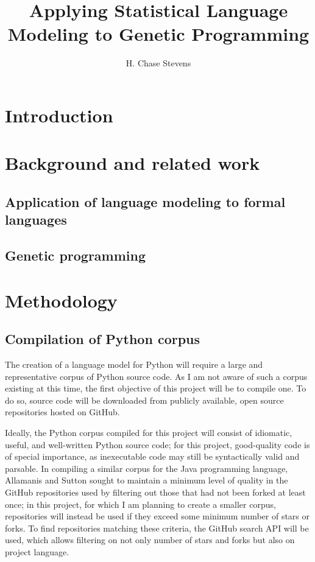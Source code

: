 \documentclass[a4paper,11pt]{proposal}
\title{Applying Statistical Language Modeling to Genetic Programming}
\author{H. Chase Stevens}
\begin{document}
\maketitle 
\parindent=0mm


\setcounter{tocdepth}{2}

\clearpage

\newpage


\setlength{\parskip}{1ex} 


\section{Introduction} \label{sec:intro}

\section{Background and related work} \label{sec:back}

\subsection{Application of language modeling to formal languages}

\subsection{Genetic programming}

\section{Methodology} \label{sec:disc}

\subsection{Compilation of Python corpus}
The creation of a language model for Python will require a large and representative corpus of Python source code. As I am not aware of such a corpus existing at this time, the first objective of this project will be to compile one. To do so, source code will be downloaded from publicly available, open source repositories hosted on GitHub. 

Ideally, the Python corpus compiled for this project will consist of idiomatic, useful, and well-written Python source code; for this project, good-quality code is of special importance, as inexecutable code may still be syntactically valid and parsable. In compiling a similar corpus for the Java programming language, Allamanis and Sutton \cite{allamanis2013} sought to maintain a minimum level of quality in the GitHub repositories used by filtering out those that had not been forked at least once; in this project, for which I am planning to create a smaller corpus, repositories will instead be used if they exceed some minimum number of stars or forks. To find repositories matching these criteria, the GitHub search API will be used, which allows filtering on not only number of stars and forks but also on project language.
\end{document}
